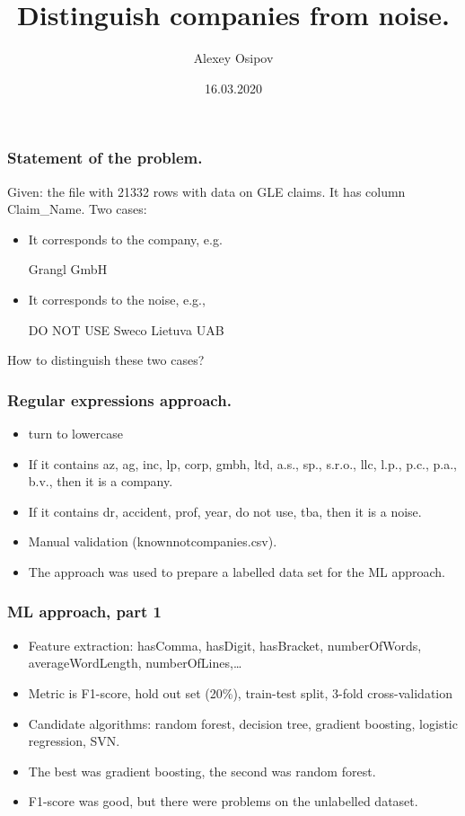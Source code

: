 \documentclass{beamer}
\title{Distinguish companies from noise.}
\author{Alexey Osipov}
\date{16.03.2020}
\begin{document}
\maketitle
\begin{frame}[fragile]
\frametitle{Statement of the problem.}
Given: the file with 21332 rows with data on GLE claims. It has column Claim\_Name.
Two cases:
\begin{itemize}
	\item It corresponds to the company, e.g.
	
	Grangl GmbH
	\item It corresponds to the noise, e.g.,
	
	DO NOT USE Sweco Lietuva UAB
\end{itemize}
How to distinguish these two cases?
\end{frame}
\begin{frame}[fragile]
\frametitle{Regular expressions approach.}
\begin{itemize}
  \item turn to lowercase
	\item If it contains az, ag, inc, lp, corp, gmbh, ltd, a.s., sp., s.r.o., llc, l.p., p.c., p.a., b.v., then it is a company.
	\item If it contains dr, accident, prof, year, do not use, tba, then it is a noise.
	\item Manual validation (knownnotcompanies.csv).
	\item The approach was used to prepare a labelled data set for the ML approach. 
\end{itemize}
\end{frame}
\begin{frame}[fragile]
\frametitle{ML approach, part 1}
\begin{itemize}
	\item Feature extraction: hasComma, hasDigit, hasBracket, numberOfWords, averageWordLength, numberOfLines,\ldots
	\item Metric is F1-score, hold out set (20\%), train-test split, 3-fold cross-validation
	\item Candidate algorithms: random forest, decision tree, gradient boosting, logistic regression, SVN.
	\item The best was gradient boosting, the second was random forest.
	\item F1-score was good, but there were problems on the unlabelled dataset.
\end{itemize}
\end{frame}
\end{document}
